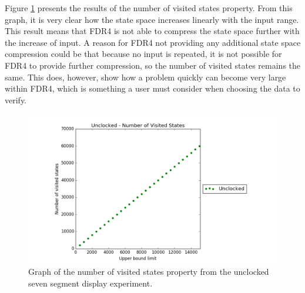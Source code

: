 Figure \ref{fig:unclocked_states} presents the results of the number of visited states property. From this graph, it is very clear how the state space increases linearly with the input range. This result means that FDR4 is not able to compress the state space further with the increase of input. A reason for FDR4 not providing any additional state space compression could be that because no input is repeated, it is not possible for FDR4 to provide further compression, so the number of visited states remains the same. This does, however, show how a problem quickly can become very large within FDR4, which is something a user must consider when choosing the data to verify.
\begin{figure}
    \centering
    \includegraphics[scale=0.6]{./figures/plots/unclocked_states.png}
\caption{Graph of the number of visited states property from the unclocked seven segment display experiment.}
\label{fig:unclocked_states}
\end{figure}
